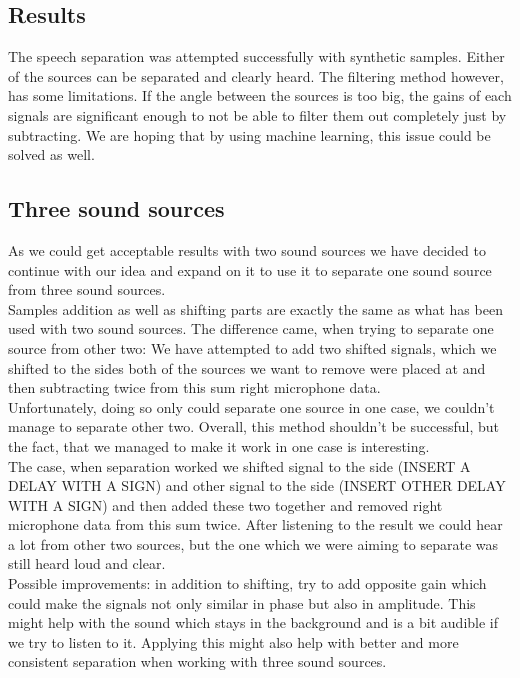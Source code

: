 \newpage
\subsection*{Results} 
The speech separation was attempted successfully with synthetic samples. Either of 
the sources can be separated and clearly heard. The filtering method however, has 
some limitations. If the angle between the sources is too big, the gains of each 
signals are significant enough to not be able to filter them out completely just 
by subtracting. We are hoping that by using machine learning, this issue could be 
solved as well.

\subsection*{Three sound sources} 
As we could get acceptable results with two sound sources we have decided to continue with 
our idea and expand on it to use it to separate one sound source from three sound sources.
\\
Samples addition as well as shifting parts are exactly the same as what has been used with 
two sound sources. The difference came, when trying to separate one source from other two: 
We have attempted to add two shifted signals, which we shifted to the sides both of the 
sources we want to remove were placed at and then subtracting twice from this sum right 
microphone data. \\
Unfortunately, doing so only could separate one source in one case, we couldn't manage to 
separate other two. Overall, this method shouldn't be successful, but the fact, that we 
managed to make it work in one case is interesting.  \\
The case, when separation worked we shifted signal to the side (INSERT A DELAY WITH A 
SIGN) and other signal to the side (INSERT OTHER DELAY WITH A SIGN) and then added these 
two together and removed right microphone data from this sum twice. After listening to the 
result we could hear a lot from other two sources, but the one which we were aiming to 
separate was still heard loud and clear.\\
Possible improvements: in addition to shifting, try to add opposite gain which could make 
the signals not only similar in phase but also in amplitude. This might help with the 
sound which stays in the background and is a bit audible if we try to listen to it. 
Applying this might also help with better and more consistent separation when working with 
three sound sources. 

